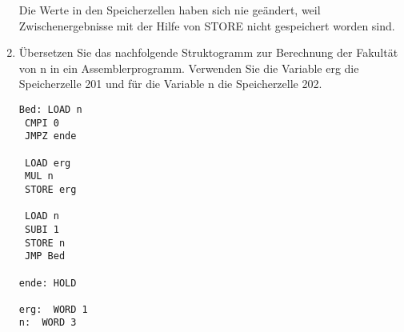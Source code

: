 \documentclass{lehramt-informatik-aufgabe}
\begin{document}
\begin{enumerate}

Die Werte in den Speicherzellen haben sich nie geändert, weil
Zwischenergebnisse mit der Hilfe von STORE nicht gespeichert worden
sind.


\item Übersetzen Sie das nachfolgende Struktogramm zur Berechnung der
Fakultät von n in ein Assemblerprogramm. Verwenden Sie die Variable erg
die Speicherzelle 201 und für die Variable n die Speicherzelle 202.

\begin{verbatim}
Bed: LOAD n
 CMPI 0
 JMPZ ende

 LOAD erg
 MUL n
 STORE erg

 LOAD n
 SUBI 1
 STORE n
 JMP Bed

ende: HOLD

erg:  WORD 1
n:  WORD 3
\end{verbatim}

\end{enumerate}
\end{document}
